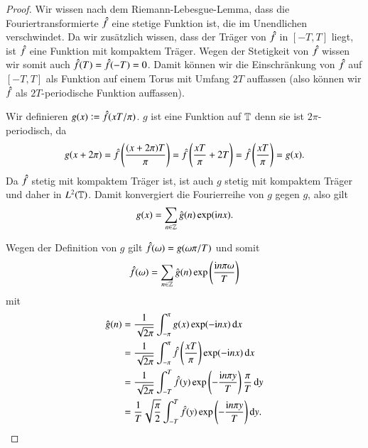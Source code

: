 \begin{proof}
  Wir wissen nach dem Riemann-Lebesgue-Lemma, dass die Fouriertransformierte $\hat{f}$ eine stetige Funktion ist, die im Unendlichen verschwindet.
  Da wir zusätzlich wissen, dass der Träger von $\hat{f}$ in $[{-T},T]$ liegt, ist $\hat{f}$ eine Funktion mit kompaktem Träger.
  Wegen der Stetigkeit von $\hat{f}$ wissen wir somit auch $\hat{f}(T)=\hat{f}(-T)=0$.
  Damit können wir die Einschränkung von $\hat{f}$ auf $[{-T},T]$ als Funktion auf einem Torus mit Umfang $2T$ auffassen (also können wir $\hat{f}$ als $2T$-periodische Funktion auffassen).


  Wir definieren $g(x):=\hat{f}(xT/\pi)$. $g$ ist eine Funktion auf $\mathbb{T}$ denn sie ist $2\pi$-periodisch, da
  \begin{equation*}
    g(x+2\pi)=
    \hat{f}\left( \frac{(x+2\pi)T}{\pi} \right)
    =\hat{f}\left(\frac{xT}{\pi} + 2T \right)
    =\hat{f}\left(\frac{xT}{\pi}\right)
    =g(x).
  \end{equation*}
  Da $\hat{f}$ stetig mit kompaktem Träger ist, ist auch $g$ stetig mit kompaktem Träger und daher in $L^2(\mathbb{T})$. Damit konvergiert die Fourierreihe von $g$ gegen $g$, also gilt
  \begin{equation*}
    g(x)=\sum_{n \in \mathbb{Z}}{\hat{g}(n) \exp(\mathrm{i} nx)}.
  \end{equation*}

  Wegen der Definition von $g$ gilt $\hat{f}(\omega)=g(\omega \pi/T)$ und somit
  \begin{equation*}
    \hat{f}(\omega)=\sum_{n \in \mathbb{Z}}{\hat{g}(n) \exp \left( \frac{\mathrm{i} n\pi\omega}{T} \right)}
  \end{equation*}
  mit
  \begin{equation*}
    \begin{split}
      \fouriertransform{g}(n)
      &=\frac{1}{\sqrt{2\pi}} \int_{-\pi}^\pi{g(x)\exp(-\i nx) \dif x} \\
      &=\frac{1}{\sqrt{2\pi}} \int_{-\pi}^\pi{\fouriertransform{f }\left( \frac{xT}{\pi} \right) \exp(-\i nx) \dif x} \\
      &=\frac{1}{\sqrt{2\pi}} \int_{-T}^T{\fouriertransform{f}(y)\exp \left( -\frac{\i n \pi y}{T} \right) \frac{\pi}{T} \dif y} \\
      &=\frac{1}{T}\sqrt{\frac{\pi}{2}}  \int_{-T}^T{\fouriertransform{f}(y)\exp \left( -\frac{\i n \pi y}{T} \right) \dif y}. \\
    \end{split}
  \end{equation*}


\end{proof}
